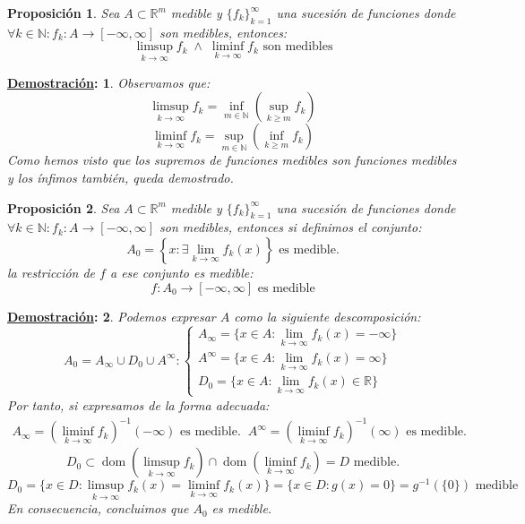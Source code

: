 \documentclass[10pt,a4paper,openright]{book}
\theoremstyle{break}
\newtheorem*{prop}{Proposición}
\newtheorem*{demo}{\underline{Demostración}:}
\DeclareMathOperator{\dom}{dom}
\begin{document}
\begin{prop}
Sea $A \subset \mathbb{R}^m$ medible y $\{f_k\}_{k=1}^\infty$ una sucesión de funciones donde $\forall k \in \mathbb{N}: f_k: A \rightarrow \left[-\infty, \infty\right]$ son medibles, entonces:
$$\limsup_{k \rightarrow \infty}f_k\; \land \;\liminf_{k \rightarrow \infty}f_k \text{ son medibles}$$
\end{prop}
\begin{demo}
Observamos que:
$$\limsup_{k \rightarrow \infty}f_k = \inf_{m\in \mathbb{N}} \left(\sup_{k\ge m} f_k\right)$$
$$\liminf_{k \rightarrow \infty}f_k = \sup_{m\in \mathbb{N}} \left(\inf_{k\ge m}f_k\right)$$
Como hemos visto que los supremos de funciones medibles son funciones medibles y los ínfimos también, queda demostrado.
\end{demo}

\begin{prop}
Sea $A \subset \mathbb{R}^m$ medible y $\{f_k\}_{k=1}^\infty$ una sucesión de funciones donde $\forall k \in \mathbb{N}: f_k: A \rightarrow \left[-\infty, \infty\right]$ son medibles, entonces si definimos el conjunto:
$$A_0 = \left\lbrace x : \exists \lim_{k \rightarrow \infty}f_k\left(x\right)\right\rbrace\text{ es medible.}$$ 
la restricción de $f$ a ese conjunto es medible:
$$f: A_0 \rightarrow \left[-\infty, \infty\right] \text{ es medible}$$
\end{prop}
\begin{demo}
Podemos expresar $A$ como la siguiente descomposición:
$$A_0 = A_{\infty} \cup D_0 \cup A^{\infty}: \begin{cases}
A_{\infty} = \{x\in A: \lim_{k \rightarrow \infty}f_k\left(x\right) = -\infty\} \\
A^{\infty} = \{x\in A: \lim_{k \rightarrow \infty}f_k\left(x\right) = \infty\} \\
D_0 = \{x\in A: \lim_{k \rightarrow \infty}f_k\left(x\right) \in \mathbb{R}\}
\end{cases}$$
Por tanto, si expresamos de la forma adecuada:
\begin{align*}
A_{\infty} = \left(\liminf_{k \rightarrow \infty}f_k \right)^{-1}\left(-\infty\right) \text{ es medible.} && A^{\infty} = \left(\liminf_{k \rightarrow \infty}f_k \right)^{-1}\left(\infty\right) \text{ es medible.}
\end{align*}
$$D_0 \subset \dom\left(\limsup_{k \rightarrow \infty}f_k\right) \cap \dom\left(\liminf_{k \rightarrow \infty}f_k\right) = D \text{ medible.}$$
$$D_0 = \{x \in D: \limsup_{k \rightarrow \infty}f_k\left(x\right) = \liminf_{k \rightarrow \infty}f_k\left(x\right)\} = \{x \in D: g\left(x\right) = 0\} = g^{-1}\left(\{0\}\right) \text{ medible}$$
En consecuencia, concluimos que $A_0$ es medible.
\end{demo}
\end{document}
